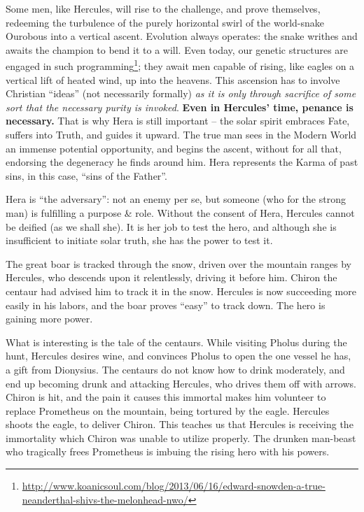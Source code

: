 Some men, like Hercules, will rise to the challenge, and prove themselves, redeeming the turbulence of the purely horizontal swirl of the world-snake Ourobous into a vertical ascent. Evolution always operates: the snake writhes and awaits the champion to bend it to a will. Even today, our genetic structures are engaged in such programming\footnote{\url{http://www.koanicsoul.com/blog/2013/06/16/edward-snowden-a-true-neanderthal-shivs-the-melonhead-nwo/}}; they await men capable of rising, like eagles on a vertical lift of heated wind, up into the heavens. This ascension has to involve Christian ``ideas'' (not necessarily formally) \emph{as it is only through sacrifice of some sort that the necessary purity is invoked}. \textbf{Even in Hercules' time, penance is necessary.} That is why Hera is still important -- the solar spirit embraces Fate, suffers into Truth, and guides it upward. The true man sees in the Modern World an immense potential opportunity, and begins the ascent, without for all that, endorsing the degeneracy he finds around him. Hera represents the Karma of past sins, in this case, ``sins of the Father''.

Hera is ``the adversary'': not an enemy per se, but someone (who for the strong man) is fulfilling a purpose \& role. Without the consent of Hera, Hercules cannot be deified (as we shall she). It is her job to test the hero, and although she is insufficient to initiate solar truth, she has the power to test it.

The great boar is tracked through the snow, driven over the mountain ranges by Hercules, who descends upon it relentlessly, driving it before him. Chiron the centaur had advised him to track it in the snow. Hercules is now succeeding more easily in his labors, and the boar proves ``easy'' to track down. The hero is gaining more power.

What is interesting is the tale of the centaurs. While visiting Pholus during the hunt, Hercules desires wine, and convinces Pholus to open the one vessel he has, a gift from Dionysius. The centaurs do not know how to drink moderately, and end up becoming drunk and attacking Hercules, who drives them off with arrows. Chiron is hit, and the pain it causes this immortal makes him volunteer to replace Prometheus on the mountain, being tortured by the eagle. Hercules shoots the eagle, to deliver Chiron. This teaches us that Hercules is receiving the immortality which Chiron was unable to utilize properly. The drunken man-beast who tragically frees Prometheus is imbuing the rising hero with his powers.

